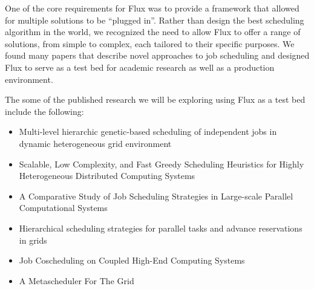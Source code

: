 One of the core requirements for Flux was to provide a framework that
allowed for multiple solutions to be ``plugged in''.  Rather than
design the best scheduling algorithm in the world, we recognized the
need to allow Flux to offer a range of solutions, from simple to
complex, each tailored to their specific purposes.  We found many
papers that describe novel approaches to job scheduling and designed
Flux to serve as a test bed for academic research as well as a
production environment.

The some of the published research we will be exploring using Flux as a
test bed include the following:

\begin{itemize}
\item Multi-level hierarchic genetic-based scheduling of independent jobs in dynamic heterogeneous grid environment~\cite{Koodziej20121}

\item Scalable, Low Complexity, and Fast Greedy Scheduling Heuristics for Highly Heterogeneous Distributed Computing Systems~\cite{Diaz13}

\item A Comparative Study of Job Scheduling Strategies in Large-scale Parallel Computational Systems~\cite{chandio2013comparative}

\item Hierarchical scheduling strategies for parallel tasks and advance reservations in grids~\cite{Kurowski13}

\item Job Coscheduling on Coupled High-End Computing Systems~\cite{6047306}

\item A Metascheduler For The Grid~\cite{1029934}

\end{itemize}
